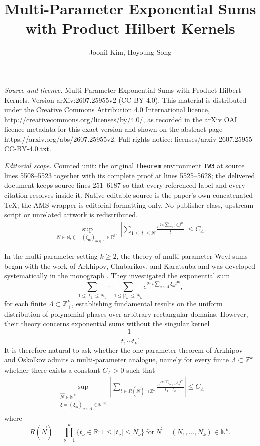 \documentclass[10pt,a4paper]{amsart}
\numberwithin{equation}{section}
\begin{document}
\title[Multi-Parameter Exponential Sums with Product Hilbert Kernel]{Multi-Parameter Exponential Sums with Product Hilbert Kernels}
\author{Joonil Kim, Hoyoung Song}
\date{}
\maketitle
\noindent\emph{Source and licence.} Multi-Parameter Exponential Sums with Product Hilbert Kernels. Version arXiv:2607.25955v2 (CC BY 4.0). This material is distributed under the Creative Commons Attribution 4.0 International licence, http://creativecommons.org/licenses/by/4.0/, as recorded in the arXiv OAI licence metadata for this exact version and shown on the abstract page https://arxiv.org/abs/2607.25955v2. Full rights notice: licenses/arxiv-2607.25955-CC-BY-4.0.txt.\par\smallskip
\noindent\textit{Editorial scope.} Counted unit: the original \texttt{theorem} environment \texttt{IW3} at source lines 5508--5523 together with its complete proof at lines 5525--5628; the delivered document keeps source lines 251--6187 so that every referenced label and every citation resolves inside it. Native editable source is the paper's own concatenated TeX; the AMS wrapper is editorial formatting only. No publisher class, upstream script or unrelated artwork is redistributed.
\begin{align}\label{11}
	\sup_{N\in\mathbb N,\,
		\xi=(\xi_{\mathfrak m})_{\mathfrak m\in\Lambda}\in\mathbb R^{|\Lambda|}}
	\left|
	\sum_{1\le |t|\le N}
	\frac{
		e^{2\pi i
			\sum_{\mathfrak m\in\Lambda}
			\xi_{\mathfrak m}t^{\mathfrak m}}
	}{t}
	\right|
	\le C_\Lambda.
\end{align}


In the multi-parameter setting $k\ge 2$, the theory of multi-parameter Weyl sums began with the work of
Arkhipov, Chubarikov, and Karatsuba \cite{AC} and was developed
systematically in the monograph \cite{ACK}.  They investigated the
exponential sum 
\[
\sum_{1\le |t_1|\le N_1}\cdots
\sum_{1\le |t_k|\le N_k}
e^{2\pi i \sum_{\mathfrak{m}\in \Lambda} \xi_{\mathfrak{m}} t^{\mathfrak{m}} },
\]
for each finite $\Lambda\subset \mathbb{Z}^k_+$,  establishing fundamental results on the uniform distribution of polynomial phases over arbitrary rectangular domains.   However, their theory concerns exponential sums without the singular
kernel
\[
\frac1{t_1\cdots t_k}.
\]
It is therefore natural to ask whether the one-parameter theorem of
Arkhipov and Oskolkov admits a multi-parameter analogue, namely  for every finite
$\Lambda\subset\mathbb Z_+^k$   whether 
there exists a constant
$C_\Lambda>0$ such that
\begin{align}\label{1tt}
	\sup_{\substack{
			\vec N\in\mathbb N^k\\
			\xi=(\xi_{\mathfrak m})_{\mathfrak m\in\Lambda}\in\mathbb R^{|\Lambda|}
	}}
	\left|
	\sum_{t\in R(\vec N)\cap \mathbb{Z}^k}
	\frac{e^{2\pi i\sum_{\mathfrak m\in\Lambda}
			\xi_{\mathfrak m}t^{\mathfrak m}}}{t_1\cdots t_k}
	\right|
	\le C_\Lambda 
\end{align}
where
\[
R(\vec N)
=
\prod_{\nu=1}^k
\{t_\nu\in \mathbb{R}:1\le |t_\nu|\le N_{\nu}\}\ \text{for}\ \vec N=(N_1,\ldots,N_k)\in\mathbb N^k.
\]
\end{document}
